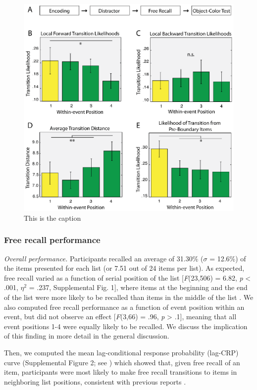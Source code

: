 \begin{figure}[htbp]
\centering
\includegraphics{figures/chapter1_figure4}
\caption{This is the caption}
\end{figure}

\subsubsection{Free recall performance}\label{free-recall-performance}

\emph{Overall performance.} Participants recalled an average of 31.30\%
(\(\sigma\) = 12.6\%) of the items presented for each list (or 7.51 out
of 24 items per list). As expected, free recall varied as a function of
serial position of the list {[}\emph{F}(23,506) = 6.82, \emph{p}
\textless{} .001, \(\eta^{2}\) = .237, Supplemental Fig. 1{]}, where
items at the beginning and the end of the list were more likely to be
recalled than items in the middle of the list
\autocite{murdock_serial_1962}. We also computed free recall performance
as a function of event position within an event, but did not observe an
effect {[}\emph{F}(3,66) = .96, \emph{p} \textgreater{} .1{]}, meaning
that all event positions 1-4 were equally likely to be recalled. We
discuss the implication of this finding in more detail in the general
discussion.

Then, we computed the mean lag-conditional response probability
(lag-CRP) curve (Supplemental Figure 2; see
\autocite{kahana_associative_1996}) which showed that, given free recall
of an item, participants were most likely to make free recall
transitions to items in neighboring list positions, consistent with
previous reports
\autocites{howard_distributed_2002}{kahana_associative_1996}.

